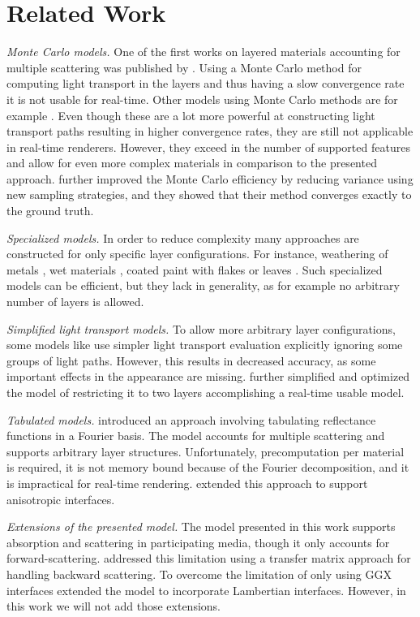 \section{Related Work}
\label{sec:related_work}

\textit{Monte Carlo models.} One of the first works on layered materials accounting for multiple scattering was published by \textcite{hanrahan1993}. Using a Monte Carlo method for computing light transport in the layers and thus having a slow convergence rate it is not usable for real-time. Other models using Monte Carlo methods are for example \parencite{guo2018,gamboa2020}. Even though these are a lot more powerful at constructing light transport paths resulting in higher convergence rates, they are still not applicable in real-time renderers. However, they exceed in the number of supported features and allow for even more complex materials in comparison to the presented approach. \textcite{xia2020} further improved the Monte Carlo efficiency by reducing variance using new sampling strategies, and they showed that their method converges exactly to the ground truth.

\textit{Specialized models.} In order to reduce complexity many approaches are constructed for only specific layer configurations. For instance, weathering of metals \parencite{hanrahan1996}, wet materials \parencite{jensen1999}, coated paint with flakes \parencite{ershov2001} or leaves \parencite{wang2006}. Such specialized models can be efficient, but they lack in generality, as for example no arbitrary number of layers is allowed.

\textit{Simplified light transport models.} To allow more arbitrary layer configurations, some models like \parencite{wilkie2007} use simpler light transport evaluation explicitly ignoring some groups of light paths. However, this results in decreased accuracy, as some important effects in the appearance are missing. \textcite{elek2010} further simplified and optimized the model of \textcite{wilkie2007} restricting it to two layers accomplishing a real-time usable model. 

\textit{Tabulated models.} \textcite{jakob2014} introduced an approach involving tabulating reflectance functions in a Fourier basis. The model accounts for multiple scattering and supports arbitrary layer structures. Unfortunately, precomputation per material is required, it is not memory bound because of the Fourier decomposition, and it is impractical for real-time rendering. \textcite{zeltner2018} extended this approach to support anisotropic interfaces.

\textit{Extensions of the presented model.} The model \parencite{belcour2018} presented in this work supports absorption and scattering in participating media, though it only accounts for forward-scattering. \textcite{xia2020} addressed this limitation using a transfer matrix approach for handling backward scattering. To overcome the limitation of only using GGX interfaces \textcite{belcour2022} extended the model to incorporate Lambertian interfaces. However, in this work we will not add those extensions.
